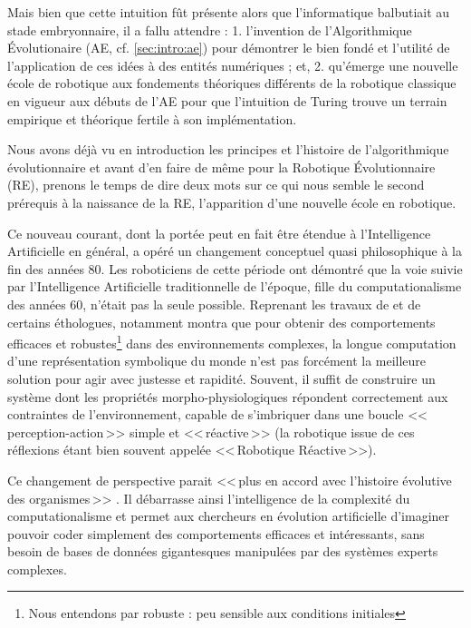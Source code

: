 Mais bien que cette intuition fût présente alors que l'informatique balbutiait au stade embryonnaire, il a fallu attendre : 1. l'invention de l'Algorithmique \'Evolutionaire (AE, cf. \ref{sec:intro:ae}) pour démontrer le bien fondé et l'utilité de l'application de ces idées à des entités numériques ; et, 2. qu'émerge une nouvelle école de robotique aux fondements théoriques différents de la robotique classique en vigueur aux débuts de l'AE pour que l'intuition de Turing trouve un terrain empirique et théorique fertile à son implémentation.

Nous avons déjà vu en introduction les principes et l'histoire de l'algorithmique évolutionnaire et avant d'en faire de même pour la Robotique \'Evolutionnaire (RE), prenons le temps de dire deux mots sur ce qui nous semble le second prérequis à la naissance de la RE, l'apparition d'une nouvelle école en robotique.

Ce nouveau courant, dont la portée peut en fait être étendue à l'Intelligence Artificielle en général, a opéré un changement conceptuel quasi philosophique à la fin des années 80. Les roboticiens de cette période ont démontré que la voie suivie par l'Intelligence Artificielle traditionnelle de l'époque, fille du computationalisme des années 60, n'était pas la seule possible. Reprenant les travaux de \citet{braintenberg86vehicles} et de certains éthologues, \cite{brooks91intelligencewithoutreason} notamment montra que pour obtenir des comportements efficaces et robustes\footnote{Nous entendons par robuste : peu sensible aux conditions initiales} dans des environnements complexes, la longue computation d'une représentation symbolique du monde n'est pas forcément la meilleure solution pour agir avec justesse et rapidité. Souvent, il suffit de construire un système dont les propriétés morpho-physiologiques répondent correctement aux contraintes de l'environnement, capable de s'imbriquer dans une boucle <<\,perception-action\,>> simple et <<\,réactive\,>> (la robotique issue de ces réflexions étant bien souvent appelée <<\,Robotique Réactive\,>>).

Ce changement de perspective parait <<\,plus en accord avec l'histoire évolutive des organismes\,>> \citep[Brooks dans la préface de ][p. 15]{pfeifer2006howthebodyshapesthewaywethink}. Il débarrasse ainsi l'intelligence de la complexité du computationalisme et permet aux chercheurs en évolution artificielle d'imaginer pouvoir coder simplement des comportements efficaces et intéressants, sans besoin de bases de données gigantesques manipulées par des systèmes experts complexes.

